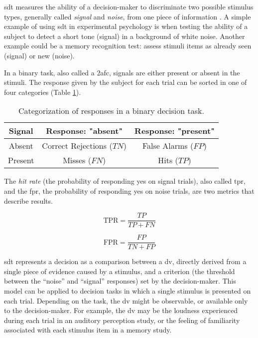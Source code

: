 \acrshort{sdt} measures the ability of a decision-maker to discriminate two possible stimulus types, generally called \textit{signal} and \textit{noise}, from one piece of information \cite{stanislawCalculationSignalDetection1999}. A simple example of using \acrshort{sdt} in experimental psychology is when testing the ability of a subject to detect a short tone (signal) in a background of white noise. Another example could be a memory recognition test: assess stimuli items as already seen (signal) or new (noise).

In a binary task, also called a \acrfull{2afc}, signals are either present or absent in the stimuli. The response given by the subject for each trial can be sorted in one of four categories (Table \ref{table:1}).

\begin{table}[h!]
    \centering
    \begin{tabular}{ ||c||c|c|| }
        \hline
        Signal  & Response: "absent"        & Response: "present" \\
        \hline\hline
        Absent  & Correct Rejections ($TN$) & False Alarms ($FP$) \\
        \hline
        Present & Misses ($FN$)             & Hits ($TP$)         \\
        \hline
    \end{tabular}
    \caption{Categorization of responses in a binary decision task.}
    \label{table:1}
\end{table}

The \textit{hit rate} (the probability of responding yes on signal trials), also called \acrfull{tpr}, and the \acrfull{fpr}, the probability of responding yes on noise trials, are two metrics that describe results.

$$\text{TPR} = \frac{TP}{TP + FN}$$

$$\text{FPR} = \frac{FP}{TN+FP}$$

\acrshort{sdt} represents a decision as a comparison between a \acrfull{dv}, directly derived from a single piece of evidence caused by a stimulus, and a criterion (the threshold between the “noise” and “signal” responses) set by the decision-maker. This model can be applied to decision tasks in which a single stimulus is presented on each trial. Depending on the task, the \acrshort{dv} might be observable, or available only to the decision-maker. For example, the \acrshort{dv} may be the loudness experienced during each trial in an auditory perception study, or the feeling of familiarity associated with each stimulus item in a memory study.

